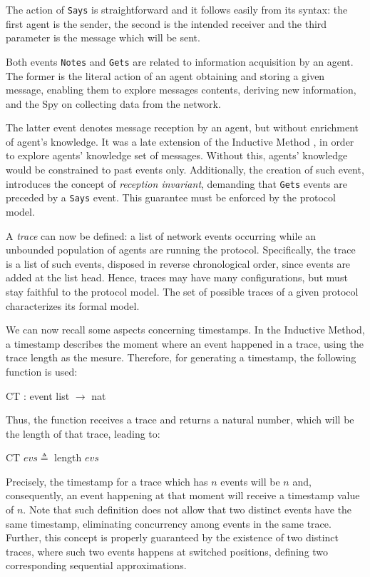 The action of \texttt{Says} is straightforward and it follows easily from its syntax: the first agent is the sender, the second is the intended receiver and the third parameter is the message which will be sent.

Both events \texttt{Notes} and \texttt{Gets} are related to information acquisition by an agent. The former is the literal action of an agent obtaining and storing a given message, enabling them to explore messages contents, deriving new information, and the Spy on collecting data from the network.

The latter event denotes message reception by an agent, but without enrichment of agent's knowledge. It was a late extension of the Inductive Method \cite[Ch. 8]{bella-book}, in order to explore agents' knowledge set of messages. Without this, agents' knowledge would be constrained to past events only. Additionally, the creation of such event, introduces the concept of \textit{reception invariant}, demanding that \texttt{Gets} events are preceded by a \texttt{Says} event. This guarantee must be enforced by the protocol model.

A \textit{trace} can now be defined: a list of network events occurring while an unbounded population of agents are running the protocol. Specifically, the trace is a list of such events, disposed in reverse chronological order, since events are added at the list head. Hence, traces may have many configurations, but must stay faithful to the protocol model. The set of possible traces of a given protocol characterizes its formal model.

We can now recall some aspects concerning timestamps. In the Inductive Method, a timestamp describes the moment where an event happened in a trace, using the trace length as the mesure. Therefore, for generating a timestamp, the following function is used:

\begin{center}
  {\ttfamily CT : event list $\longrightarrow$ nat}
\end{center}

Thus, the function receives a trace and returns a natural number, which will be the length of that trace, leading to:

\begin{center}
  {\ttfamily CT $evs \triangleq$ length $evs$}
\end{center}

Precisely, the timestamp for a trace which has $n$ events will be $n$ and, consequently, an event happening at that moment will receive a timestamp value of $n$. Note that such definition does not allow that two distinct events have the same timestamp, eliminating concurrency among events in the same trace. Further, this concept is properly guaranteed by the existence of two distinct traces, where such two events happens at switched positions, defining two corresponding sequential approximations.



